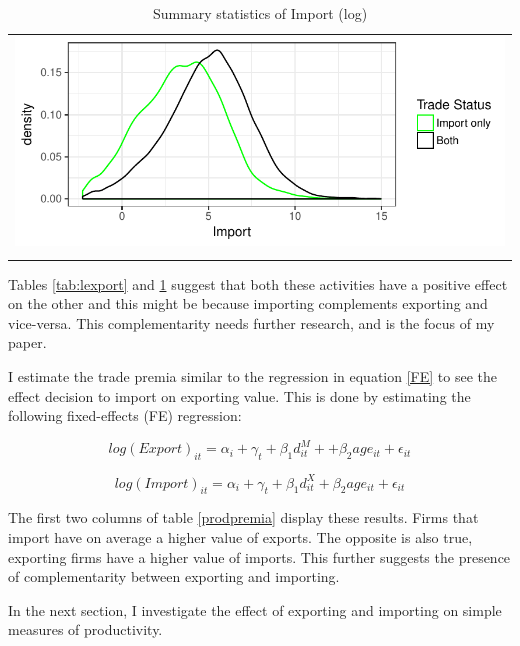 \documentclass[12pt]{article}
\begin{document}
\begin{center}
\begin{table}[H]
\caption{Summary statistics of Import (log)}
\label{tab:limport}
\begin{tabular}{c}
 \includegraphics{./PICS/denslimport.pdf}   \\ 
   \\  
\end{tabular}
\end{table}
\end{center}

Tables \ref{tab:lexport} and \ref{tab:limport} suggest that both these activities have a
positive effect on the other and this might be because importing
complements exporting and vice-versa. This complementarity needs
further research, and is the focus of my paper. 

I estimate the trade premia similar to the regression in equation
\ref{FE} to see the effect decision to import on exporting value. This is done by estimating the
following fixed-effects (FE) regression:

$$  log(Export)_{it} = \alpha_{i} + \gamma_{t} +  \beta_{1} d_{it}^{M}+
+ \beta_{2} age_{it} + \epsilon_{it}$$

$$  log(Import)_{it} = \alpha_{i} + \gamma_{t} + \beta_{1} d_{it}^{X} + \beta_{2} age_{it} + \epsilon_{it}$$ 

\begin{center}

\end{center}

The first two columns of table \ref{prodpremia} display these
results. Firms that  import have on average a higher value of exports. The
opposite is also true,
exporting firms have a higher value of imports.  This further suggests the presence of complementarity
between exporting and importing. 

In the next section, I investigate the effect of exporting and importing on
simple measures of productivity.
 
\end{document}
